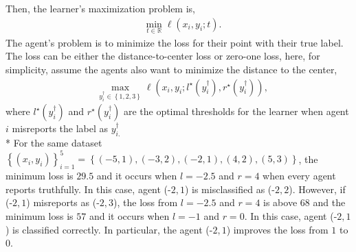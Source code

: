 \documentclass{article}
\begin{document}
Then, the learner's maximization problem is,
\begin{align*}
&\displaystyle\min_{t \in \mathbb{R}} \ell\left(x_{i}, y_{i}; t\right).
\end{align*}
The agent's problem is to minimize the loss for their point with their true label. The loss can be either the distance-to-center loss or zero-one loss, here, for simplicity, assume the agents also want to minimize the distance to the center,
\begin{align*}
&\displaystyle\max_{y^{\dagger}_{i} \in \left\{1, 2, 3\right\}} \ell\left(x_{i}, y_{i}; l^\star \left(y^{\dagger}_{i}\right), r^\star \left(y^{\dagger}_{i}\right)\right),
\end{align*}
where $l^\star \left(y^{\dagger}_{i}\right)$ and $r^\star \left(y^{\dagger}_{i}\right)$ are the optimal thresholds for the learner when agent $i $ misreports the label as $y^{\dagger}_{i.}$
\\* For the same dataset $\left\{\left(x_{i}, y_{i}\right)\right\}_{i=1}^{5} = \left\{\left(-5, 1\right), \left(-3, 2\right), \left(-2, 1\right), \left(4, 2\right), \left(5, 3\right)\right\}$, the minimum loss is $29.5$ and it occurs when $l  = -2.5$ and $r = 4$ when every agent reports truthfully. In this case, agent (-$2, 1$) is misclassified as (-$2, 2$). However, if (-$2, 1$) misreports as (-$2, 3$), the loss from $l  = -2.5$ and $r = 4$ is above $68$ and the minimum loss is $57$ and it occurs when $l  = -1$ and $r  = 0$. In this case, agent (-$2, 1$) is classified correctly. In particular, the agent (-$2, 1$) improves the loss from $1$ to $0$.
\newline \newline

\begin{figure}[H] \centering {} \label{fig:2dat}
\end{figure}
\end{document}
